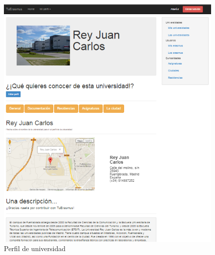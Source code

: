 \begin{figure}[htbp]
	
	\centering
	\includegraphics[scale=0.7]{./Figuras/tuerasmusPages/privatePages/uniProfile.png}
	\caption{Perfil de universidad}
	\label{fig:uniP}
	
\end{figure}
